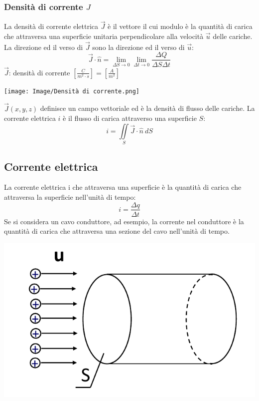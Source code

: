 \documentclass{article}
\begin{document}
\subsubsection{Densità di corrente \texorpdfstring{$J$}{J}}
La densità di corrente elettrica $\vec J$ è il vettore il cui modulo è la quantità di
carica che attraversa una superficie unitaria perpendicolare alla velocità $\vec u$
delle cariche. La direzione ed il verso di $\vec J$ sono la direzione ed il verso di $\vec u$:
\[
    \vec J \cdot \hat n = \lim_{\Delta S \rightarrow 0} \lim_{\Delta t \rightarrow 0} \frac{\Delta Q}{\Delta S \Delta t}
\]
$\vec J$: densità di corrente $\left[\frac{C}{m^2\cdot s}\right] = \left[\frac{A}{m^2} \right]$

\begin{center}
    \texttt{[image: Image/Densità di corrente.png]}
\end{center}

$\vec J(x,y,z)$ definisce un campo vettoriale ed è la densità di flusso delle
cariche. La corrente elettrica $i$ è il flusso di carica attraverso una
superficie $S$:
\[
    i = \iint\limits_S \vec J \cdot \hat n \ dS
\]




\subsection{Corrente elettrica}
La corrente elettrica i che attraversa una superficie è la quantità di carica
che attraversa la superficie nell’unità di tempo:
\[
     i = \frac{\Delta q}{\Delta t} 
\]
Se si considera un cavo conduttore, ad esempio, la corrente nel conduttore è la
quantità di carica che attraversa una sezione del cavo nell'unità di tempo.

\begin{center}
    \includegraphics[scale=0.3]{Image/Corrente conduttore.png}
\end{center}
\end{document}

